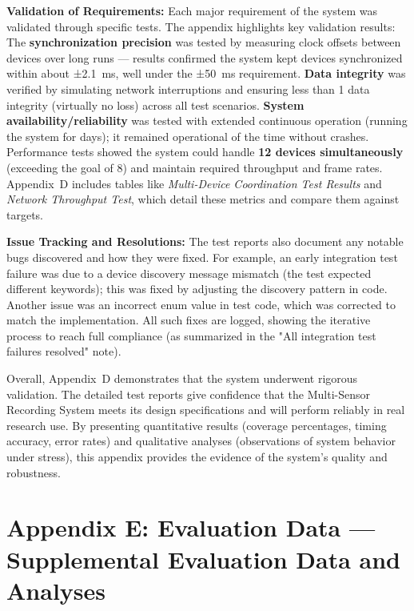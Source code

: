 \textbf{Validation of Requirements:} Each major requirement of the system was
validated through specific tests. The appendix highlights key validation
results: The \textbf{synchronization precision} was tested by measuring clock
offsets between devices over long runs --- results confirmed the system
kept devices synchronized within about ±2.1 ms, well under the ±50 ms
requirement\cite{ref42}.
\textbf{Data integrity} was verified by simulating network interruptions and
ensuring less than 1%
data integrity (virtually no loss) across all test
scenarios\cite{ref7}.
\textbf{System availability/reliability} was tested with extended continuous
operation (running the system for days); it remained operational %
of the time without
crashes\cite{ref7}.
Performance tests showed the system could handle \textbf{12 devices
simultaneously} (exceeding the goal of 8) and maintain required
throughput and frame
rates\cite{ref43}.
Appendix D includes tables like \textit{Multi-Device Coordination Test Results}
and \textit{Network Throughput Test}, which detail these metrics and compare
them against targets.

\textbf{Issue Tracking and Resolutions:} The test reports also document any
notable bugs discovered and how they were fixed. For example, an early
integration test failure was due to a device discovery message mismatch
(the test expected different keywords); this was fixed by adjusting the
discovery pattern in
code\cite{ref44}.
Another issue was an incorrect enum value in test code, which was
corrected to match the
implementation\cite{ref45}.
All such fixes are logged, showing the iterative process to reach full
compliance (as summarized in the "All integration test failures
resolved"
note\cite{ref46}).

Overall, Appendix D demonstrates that the system underwent rigorous
validation. The detailed test reports give confidence that the
Multi-Sensor Recording System meets its design specifications and will
perform reliably in real research use. By presenting quantitative
results (coverage percentages, timing accuracy, error rates) and
qualitative analyses (observations of system behavior under stress),
this appendix provides the evidence of the system's quality and
robustness.

\section{Appendix E: Evaluation Data --- Supplemental Evaluation Data and Analyses}

